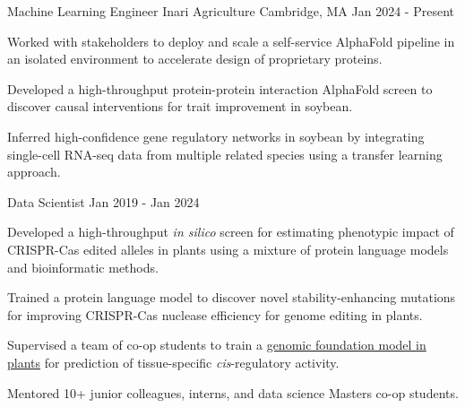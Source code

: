 

\begin{cventries}

  \cventry
    {Machine Learning Engineer} %
    {Inari Agriculture} %
    {Cambridge, MA} %
    {Jan 2024 - Present} %
    {
      \begin{cvitems} %
        \item {Worked with stakeholders to deploy and scale a self-service AlphaFold pipeline in an isolated environment to accelerate design of proprietary proteins.}
        \item {Developed a high-throughput protein-protein interaction AlphaFold screen to discover causal interventions for trait improvement in soybean.}
        \item {Inferred high-confidence gene regulatory networks in soybean by integrating single-cell RNA-seq data from multiple related species using a transfer learning approach.}
      \end{cvitems}
    }

    \cventry
    {Data Scientist} %
    {} %
    {} %
    {Jan 2019 - Jan 2024} %
    {
      \begin{cvitems} %
        \item {Developed a high-throughput \textit{in silico} screen for estimating phenotypic impact of CRISPR-Cas edited alleles in plants using a mixture of protein language models and bioinformatic methods.}
        \item {Trained a protein language model to discover novel stability-enhancing mutations for improving CRISPR-Cas nuclease efficiency for genome editing in plants.}
        \item {Supervised a team of co-op students to train a \href{https://assets-eu.researchsquare.com/files/rs-1927200/v1_covered.pdf}{genomic foundation model in plants} for prediction of tissue-specific \textit{cis}-regulatory activity.}
        \item {Mentored 10+ junior colleagues, interns, and data science Masters co-op students.}
      \end{cvitems}
    }


\end{cventries}
